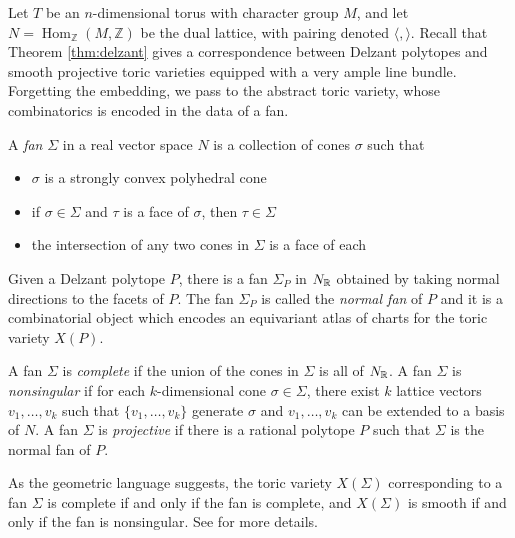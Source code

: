 Let \( T \) be an \( n \)-dimensional torus with character group \( M \),
 and let \( N = \operatorname{Hom}_{\mathbb{Z}}(M, \mathbb{Z}) \) be
  the dual lattice, with pairing denoted \( \langle , \rangle \). Recall that Theorem \ref{thm:delzant} gives a correspondence between Delzant polytopes 
and smooth projective toric varieties equipped with a very ample line bundle.
Forgetting the embedding, we pass to the abstract toric variety, whose combinatorics is encoded in the data of a fan.

\begin{definition}
    A \emph{fan} $\Sigma$ in a real vector space $N$ is a collection of cones
    $\sigma$ such that \begin{itemize}
        \item $\sigma$ is a strongly convex polyhedral cone
        \item if $\sigma\in\Sigma$ and $\tau$ is a face of $\sigma$, then $\tau\in\Sigma$
        \item the intersection of any two cones in $\Sigma$ is a face of each
    \end{itemize}
\end{definition}

Given a Delzant polytope $P$, there is a fan $\Sigma_P$ in $N_{\mathbb{R}}$ obtained by taking 
normal directions to the facets of $P$. The fan $\Sigma_P$ is called the \emph{normal fan} of $P$
and it is a combinatorial object which encodes an equivariant atlas of charts for the toric variety $X(P)$.

\begin{definition}
    A fan $\Sigma$ is \emph{complete} if the union of the cones in $\Sigma$ is all of $N_{\mathbb{R}}$.
    A fan $\Sigma$ is \emph{nonsingular} if for each $k$-dimensional cone $\sigma\in\Sigma$,
    there exist $k$ lattice vectors $v_1,\dots,v_k$ such that $\{v_1,\dots,v_k\}$ generate $\sigma$
    and $v_1,\dots,v_k$ can be extended to a basis of $N$.
    A fan $\Sigma$ is \emph{projective} if there is a rational polytope $P$ such that $\Sigma$ is the normal fan of $P$.
\end{definition}

As the geometric language suggests, the toric variety $X(\Sigma)$ corresponding to a fan $\Sigma$ is complete if and only if the fan is complete, and $X(\Sigma)$ is smooth if and only if the fan is nonsingular. See \cite{cls} for more details. 

